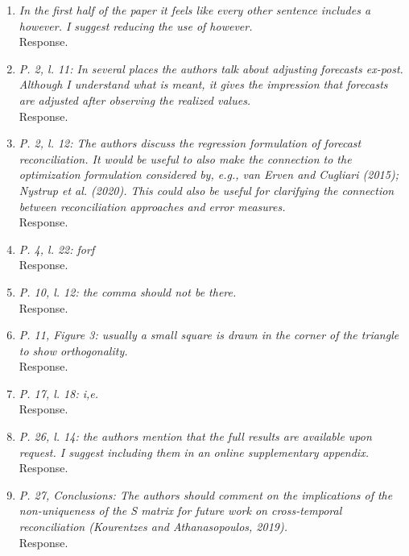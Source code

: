 \documentclass[a4paper,11pt]{article}
\begin{document}
	    \begin{enumerate}
	    
	    \item \textit{In the first half of the paper it feels like every other sentence includes a however. I suggest reducing the use of however.}\\
	    Response.\\
	    
	    \item \textit{P. 2, l. 11: In several places the authors talk about adjusting forecasts ex-post. Although I understand what is meant, it gives the impression that forecasts are adjusted after observing the realized values.}\\
	    Response.\\
	    
	    \item \textit{P. 2, l. 12: The authors discuss the regression formulation of forecast reconciliation. It would be useful to also make the connection to the optimization formulation considered by, e.g., van Erven and Cugliari (2015); Nystrup et al. (2020). This could also be useful for clarifying the connection between reconciliation approaches and error measures.}\\
	    Response.\\
	    
	    \item \textit{P. 4, l. 22: forf}\\
	    Response.\\
	    
	    \item \textit{P. 10, l. 12: the comma should not be there.}\\
	    Response.\\
	    
	    \item \textit{P. 11, Figure 3: usually a small square is drawn in the corner of the triangle to show orthogonality.}\\
	    Response.\\
	    
	    \item \textit{P. 17, l. 18: i,e.}\\
	    Response.\\
	    
	    \item \textit{P. 26, l. 14: the authors mention that the full results are available upon request. I suggest including them in an online supplementary appendix.}\\
	    Response.\\
	    
	    \item \textit{P. 27, Conclusions: The authors should comment on the implications of the non-uniqueness of the S matrix for future work on cross-temporal reconciliation (Kourentzes and Athanasopoulos, 2019).}\\
	    Response.\\
	    
    \end{enumerate}
\end{document}
